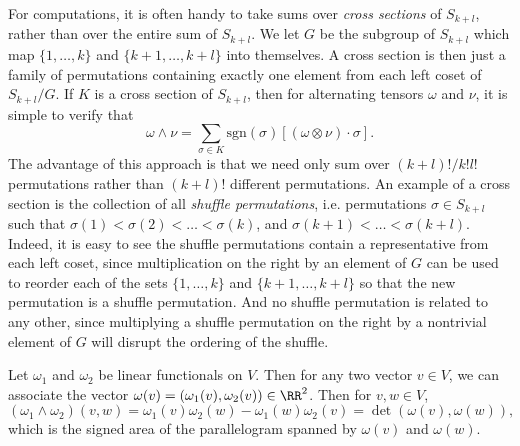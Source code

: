 \begin{remark}
    For computations, it is often handy to take sums over \emph{cross sections} of $S_{k+l}$, rather than over the entire sum of $S_{k+l}$. We let $G$ be the subgroup of $S_{k+l}$ which map $\{ 1, \dots, k \}$ and $\{ k+1, \dots, k+l \}$ into themselves. A cross section is then just a family of permutations containing exactly one element from each left coset of $S_{k+l} / G$. If $K$ is a cross section of $S_{k+l}$, then for alternating tensors $\omega$ and $\nu$, it is simple to verify that
    \[ \omega \wedge \nu = \sum_{\sigma \in K} \text{sgn}(\sigma) [(\omega \otimes \nu) \cdot \sigma]. \]
    The advantage of this approach is that we need only sum over $(k+l)! / k! l!$ permutations rather than $(k + l)!$ different permutations. An example of a cross section is the collection of all \emph{shuffle permutations}, i.e. permutations $\sigma \in S_{k+l}$ such that $\sigma(1) < \sigma(2) < \dots < \sigma(k)$, and $\sigma(k+1) < \dots < \sigma(k+l)$. Indeed, it is easy to see the shuffle permutations contain a representative from each left coset, since multiplication on the right by an element of $G$ can be used to reorder each of the sets $\{ 1, \dots, k \}$ and $\{ k+1, \dots, k+l \}$ so that the new permutation is a shuffle permutation. And no shuffle permutation is related to any other, since multiplying a shuffle permutation on the right by a nontrivial element of $G$ will disrupt the ordering of the shuffle.
\end{remark}

\begin{example}
    Let $\omega_1$ and $\omega_2$ be linear functionals on $V$. Then for any two vector $v \in V$, we can associate the vector $\omega(v) = (\omega_1(v), \omega_2(v)) \in \RR^2$. Then for $v,w \in V$,
    \[ (\omega_1 \wedge \omega_2)(v,w) = \omega_1(v) \omega_2(w) - \omega_1(w) \omega_2(v) = \det(\omega(v), \omega(w)), \]
    which is the signed area of the parallelogram spanned by $\omega(v)$ and $\omega(w)$.
\end{example}

